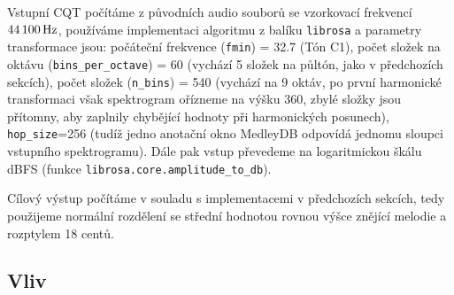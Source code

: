 Vstupní CQT počítáme z původních audio souborů se vzorkovací frekvencí $44\,100\,\rm Hz$, používáme implementaci algoritmu z balíku \texttt{librosa} a parametry transformace jsou: počáteční frekvence (\texttt{fmin}) = 32.7 (Tón C1), počet složek na oktávu (\texttt{bins\_per\_octave}) = 60 (vychází 5 složek na půltón, jako v předchozích sekcích), počet složek (\texttt{n\_bins}) = 540 (vychází na 9 oktáv, po první harmonické transformaci však spektrogram ořízneme na výšku 360, zbylé složky jsou přítomny, aby zaplnily chybějící hodnoty při harmonických posunech), \texttt{hop\_size}=256 (tudíž jedno anotační okno MedleyDB odpovídá jednomu sloupci vstupního spektrogramu). Dále pak vstup převedeme na logaritmickou škálu dBFS (funkce \texttt{librosa.core.amplitude\_to\_db}).

Cílový výstup počítáme v souladu s implementacemi v předchozích sekcích, tedy použijeme normální rozdělení se střední hodnotou rovnou výšce znějící melodie a rozptylem 18 centů.

\subsection{Vliv }

